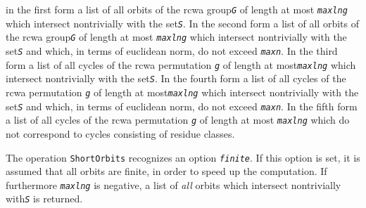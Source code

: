 \documentclass[a4paper,11pt]{report}
\begin{document}
{{{ in the first form a list of all orbits of the rcwa group{\nobreakspace}\mbox{\texttt{\mdseries\slshape G}} of length at most \mbox{\texttt{\mdseries\slshape maxlng}} which intersect non\texttt{}trivially with the set{\nobreakspace}\mbox{\texttt{\mdseries\slshape S}}. In the second form a list of all orbits of the rcwa group{\nobreakspace}\mbox{\texttt{\mdseries\slshape G}} of length at most \mbox{\texttt{\mdseries\slshape maxlng}} which intersect non\texttt{}trivially with the set{\nobreakspace}\mbox{\texttt{\mdseries\slshape S}} and which, in terms of euclidean norm, do not exceed \mbox{\texttt{\mdseries\slshape maxn}}. In the third form a list of all cycles of the rcwa permutation \mbox{\texttt{\mdseries\slshape g}} of length at most{\nobreakspace}\mbox{\texttt{\mdseries\slshape maxlng}} which intersect non\texttt{}trivially with the set{\nobreakspace}\mbox{\texttt{\mdseries\slshape S}}. In the fourth form a list of all cycles of the rcwa permutation \mbox{\texttt{\mdseries\slshape g}} of length at most{\nobreakspace}\mbox{\texttt{\mdseries\slshape maxlng}} which intersect non\texttt{}trivially with the set{\nobreakspace}\mbox{\texttt{\mdseries\slshape S}} and which, in terms of euclidean norm, do not exceed \mbox{\texttt{\mdseries\slshape maxn}}. In the fifth form a list of all cycles of the rcwa permutation \mbox{\texttt{\mdseries\slshape g}} of length at most \mbox{\texttt{\mdseries\slshape maxlng}} which do not correspond to cycles consisting of residue classes. 



 The operation \texttt{ShortOrbits} recognizes an option \mbox{\texttt{\mdseries\slshape finite}}. If this option is set, it is assumed that all orbits are finite, in order to
speed up the computation. If furthermore \mbox{\texttt{\mdseries\slshape maxlng}} is negative, a list of \emph{all} orbits which intersect non\texttt{}trivially with{\nobreakspace}\mbox{\texttt{\mdseries\slshape S}} is returned. 

}}}
\end{document}

